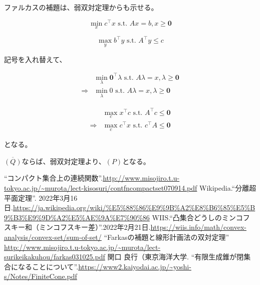 \documentclass[a4paper, 10pt, dvipdfmx]{jlreq}
\begin{document}
ファルカスの補題は、弱双対定理からも示せる。

\begin{equation*}
  \min_{x} c^\top x \text{ s.t. } Ax = b, x \geq \bm{0}
\end{equation*}

\begin{equation*}
  \max_{y} b^\top y \text{ s.t. } A^\top y \leq c
\end{equation*}

記号を入れ替えて、

\begin{align*}
              & \min_{\lambda} \bm{0}^\top \lambda \text{ s.t. } A\lambda = x, \lambda \geq \bm{0} \\
  \Rightarrow & \min_{\lambda} 0 \text{ s.t. } A\lambda = x, \lambda \geq \bm{0}
\end{align*}

\begin{align*}
              & \max_{c} x^\top c \text{ s.t. } A^\top c \leq \bm{0} \\
  \Rightarrow & \max_{c} c^\top x \text{ s.t. } c^\top A \leq \bm{0}
\end{align*}

となる。

$\overline{(Q)}$ならば、弱双対定理より、$(P)$となる。


\begin{thebibliography}{9}
  ``コンパクト集合上の連続関数''.\url{http://www.misojiro.t.u-tokyo.ac.jp/~murota/lect-kisosuri/contfncompactset070914.pdf}
  Wikipedia.``分離超平面定理''. 2022年3月16日.\url{https://ja.wikipedia.org/wiki/%E5%88%86%E9%9B%A2%E8%B6%85%E5%B9%B3%E9%9D%A2%E5%AE%9A%E7%90%86}
  WIIS.``凸集合どうしのミンコフスキー和（ミンコフスキー差）''.2022年2月21日.\url{https://wiis.info/math/convex-analysis/convex-set/sum-of-set/}
  ``Farkasの補題と線形計画法の双対定理'' \url{http://www.misojiro.t.u-tokyo.ac.jp/~murota/lect-surikeikakuhou/farkas031025.pdf}
  関口 良行（東京海洋大学. ``有限生成錐が閉集合になることについて''.\url{https://www2.kaiyodai.ac.jp/~yoshi-s/Notes/FiniteCone.pdf}
\end{thebibliography}
\end{document}
